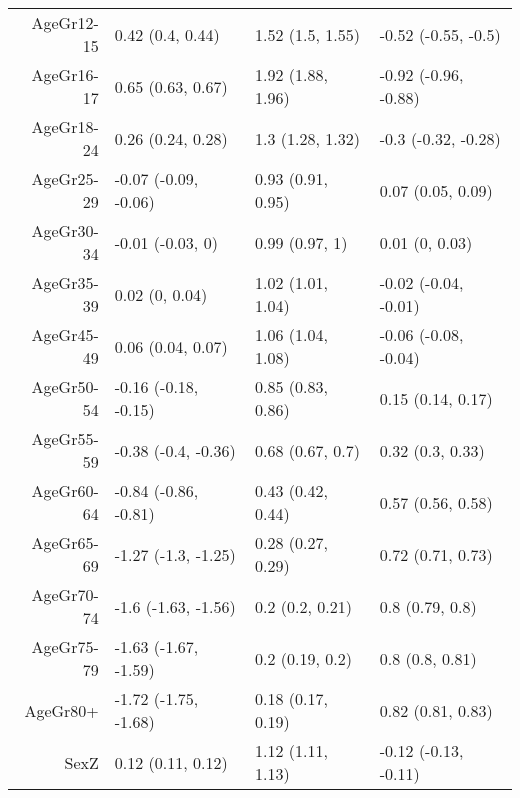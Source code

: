 \begin{table}[ht]
\begin{tabular}{rlll}
  AgeGr12-15 & 0.42 (0.4, 0.44) & 1.52 (1.5, 1.55) & -0.52 (-0.55, -0.5) \\ 
  AgeGr16-17 & 0.65 (0.63, 0.67) & 1.92 (1.88, 1.96) & -0.92 (-0.96, -0.88) \\ 
  AgeGr18-24 & 0.26 (0.24, 0.28) & 1.3 (1.28, 1.32) & -0.3 (-0.32, -0.28) \\ 
  AgeGr25-29 & -0.07 (-0.09, -0.06) & 0.93 (0.91, 0.95) & 0.07 (0.05, 0.09) \\ 
  AgeGr30-34 & -0.01 (-0.03, 0) & 0.99 (0.97, 1) & 0.01 (0, 0.03) \\ 
  AgeGr35-39 & 0.02 (0, 0.04) & 1.02 (1.01, 1.04) & -0.02 (-0.04, -0.01) \\ 
  AgeGr45-49 & 0.06 (0.04, 0.07) & 1.06 (1.04, 1.08) & -0.06 (-0.08, -0.04) \\ 
  AgeGr50-54 & -0.16 (-0.18, -0.15) & 0.85 (0.83, 0.86) & 0.15 (0.14, 0.17) \\ 
  AgeGr55-59 & -0.38 (-0.4, -0.36) & 0.68 (0.67, 0.7) & 0.32 (0.3, 0.33) \\ 
  AgeGr60-64 & -0.84 (-0.86, -0.81) & 0.43 (0.42, 0.44) & 0.57 (0.56, 0.58) \\ 
  AgeGr65-69 & -1.27 (-1.3, -1.25) & 0.28 (0.27, 0.29) & 0.72 (0.71, 0.73) \\ 
  AgeGr70-74 & -1.6 (-1.63, -1.56) & 0.2 (0.2, 0.21) & 0.8 (0.79, 0.8) \\ 
  AgeGr75-79 & -1.63 (-1.67, -1.59) & 0.2 (0.19, 0.2) & 0.8 (0.8, 0.81) \\ 
  AgeGr80+ & -1.72 (-1.75, -1.68) & 0.18 (0.17, 0.19) & 0.82 (0.81, 0.83) \\ 
  SexZ & 0.12 (0.11, 0.12) & 1.12 (1.11, 1.13) & -0.12 (-0.13, -0.11) \\ 
   \hline
\end{tabular}
\end{table}
